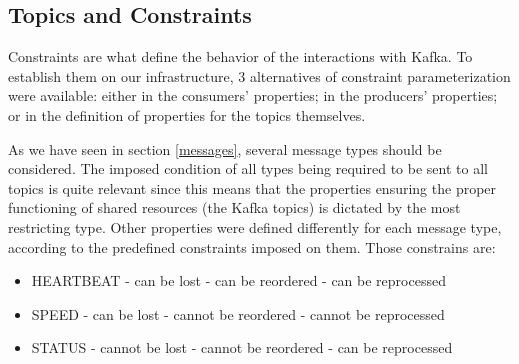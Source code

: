 \documentclass[12pt]{article}
\begin{document}
\subsection{Topics and Constraints} \label{topics} %

Constraints are what define the behavior of the interactions with Kafka.
To establish them on our infrastructure, 3 alternatives of constraint parameterization were available: 
either in the consumers' properties; in the producers' properties; or in the definition of properties for the topics themselves.

As we have seen in section \ref{messages}, several message types should be considered.
The imposed condition of all types being required to be sent to all topics is quite relevant since this means that the properties ensuring the proper functioning 
of shared resources (the Kafka topics) is dictated by the most restricting type. 
Other properties were defined differently for each message type, according to the predefined constraints imposed on them.
Those constrains are:
\vspace{-10pt}
\begin{multicols}{3}
  \begin{itemize}
    \item HEARTBEAT
    \newline - can be lost
    \newline - can be reordered
    \newline - can be reprocessed
  \end{itemize}
  \columnbreak
  \begin{itemize}
    \item SPEED
    \newline - can be lost
    \newline - cannot be reordered
    \newline - cannot be reprocessed
  \end{itemize}
  \columnbreak
  \begin{itemize}
    \item STATUS
    \newline - cannot be lost
    \newline - cannot be reordered
    \newline - can be reprocessed
  \end{itemize}
\end{multicols}
\vspace{-10pt}
\end{document}
